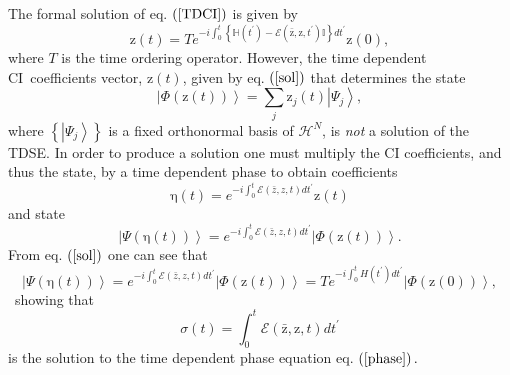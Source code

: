 \documentclass[aps,preprint]{revtex4}%
\begin{document}
The formal solution of eq. $\left(  \ref{TDCI}\right)  $ is given by
\begin{equation}
\mathrm{z}\left(  t\right)  =Te^{-i\int_{0}^{t}\left\{  \mathbb{H}\left(
t^{\prime}\right)  -\mathcal{E}\left(  \mathrm{\bar{z},z}\mathbf{,}t^{\prime
}\right)  \mathbb{I}\right\}  dt^{\prime}}\mathrm{z}\left(  0\right)  ,
\label{sol}%
\end{equation}
where $T$ is the time ordering operator. However, the time dependent
CI\ coefficients vector, $\mathrm{z}\left(  t\right)  $, given by eq. $\left(
\ref{sol}\right)  $ that determines the state
\begin{equation}
\left\vert \Phi\left(  \mathrm{z}\left(  t\right)  \right)  \right\rangle
=\sum_{j}\mathrm{z}_{j}\left(  t\right)  \left\vert \Psi_{j}\right\rangle ,
\end{equation}
where $\left\{  \left\vert \Psi_{j}\right\rangle \right\}  $ is a fixed
orthonormal basis of $\mathcal{H}^{N}$, is \emph{not }a solution of the TDSE.
In order to produce a solution one must multiply the CI coefficients, and thus
the state, by a time dependent phase to obtain coefficients
\begin{equation}
\mathrm{\eta}\left(  t\right)  =e^{-i\int_{0}^{t}\mathcal{E}\left(  \bar
{z},z\mathbf{,}t\right)  dt^{\prime}}\mathrm{z}\left(  t\right)
\label{statvec}%
\end{equation}
and state
\begin{equation}
\left\vert \Psi\left(  \mathrm{\eta}\left(  t\right)  \right)  \right\rangle
=e^{-i\int_{0}^{t}\mathcal{E}\left(  \bar{z},z\mathbf{,}t\right)  dt^{\prime}%
}\left\vert \Phi\left(  \mathrm{z}\left(  t\right)  \right)  \right\rangle .
\label{stat_state}%
\end{equation}
From eq. $\left(  \ref{sol}\right)  $ one can see that
\begin{equation}
\left\vert \Psi\left(  \mathrm{\eta}\left(  t\right)  \right)  \right\rangle
=e^{-i\int_{0}^{t}\mathcal{E}\left(  \bar{z},z\mathbf{,}t\right)  dt^{\prime}%
}\left\vert \Phi\left(  \mathrm{z}\left(  t\right)  \right)  \right\rangle
=Te^{-i\int_{0}^{t}H\left(  t^{\prime}\right)  dt^{\prime}}\left\vert
\Phi\left(  \mathrm{z}\left(  0\right)  \right)  \right\rangle ,
\end{equation}
\ showing that%
\begin{equation}
\sigma\left(  t\right)  =\int_{0}^{t}\mathcal{E}\left(  \mathrm{\bar{z}%
,z}\mathbf{,}t\right)  dt^{\prime}%
\end{equation}
is the solution to the time dependent phase equation eq. $\left(
\ref{phase}\right)  .$
\end{document}

